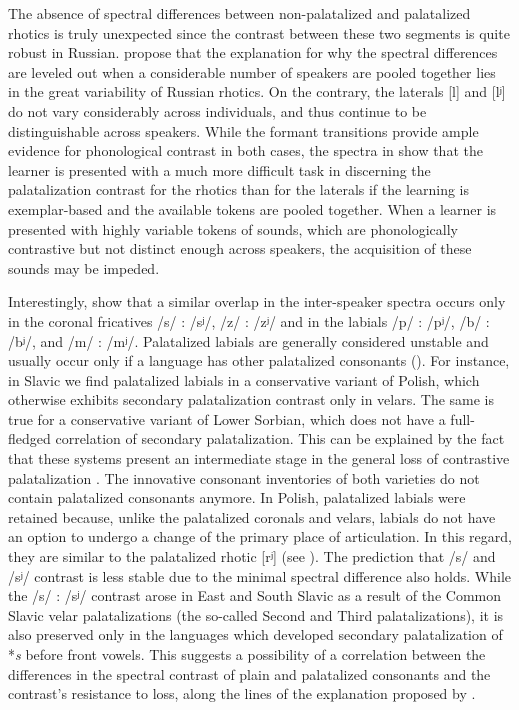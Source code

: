 \documentclass[output=paper]{langscibook}
\begin{document}
The absence of spectral differences between non-palatalized and palatalized rhotics is truly unexpected since the contrast between these two segments is quite robust in Russian. \citet{IskarousKavitskaya2018} propose that the explanation for why the spectral differences are leveled out when a considerable number of speakers are pooled together lies in the great variability of Russian rhotics. On the contrary, the laterals [l] and [lʲ] do not vary considerably across individuals, and thus continue to be distinguishable across speakers. While the formant transitions provide ample evidence for phonological contrast in both cases, the spectra in  show that the learner is presented with a much more difficult task in discerning the palatalization contrast for the rhotics than for the laterals if the learning is exemplar-based and the available tokens are pooled together. When a learner is presented with highly variable tokens of sounds, which are phonologically contrastive but not distinct enough across speakers, the acquisition of these sounds may be impeded.

Interestingly, \citet{IskarousKavitskaya2018} show that a similar overlap in the inter-speaker spectra occurs only in the coronal fricatives /s/ : /sʲ/, /z/ : /zʲ/ and in the labials /p/ : /pʲ/, /b/ : /bʲ/, and /m/ : /mʲ/. Palatalized labials are generally considered unstable and usually occur only if a language has other palatalized consonants (\citealt{Hock2006,Bateman2011}). For instance, in Slavic we find palatalized labials in a conservative variant of Polish, which otherwise exhibits secondary palatalization contrast only in velars. The same is true for a conservative variant of Lower Sorbian, which does not have a full-fledged correlation of secondary palatalization. This can be explained by the fact that these systems present an intermediate stage in the general loss of contrastive palatalization \citep[33 ff.]{Stadnik2002}. The innovative consonant inventories of both varieties do not contain palatalized consonants anymore. In Polish, palatalized labials were retained because, unlike the palatalized coronals and velars, labials do not have an option to undergo a change of the primary place of articulation. In this regard, they are similar to the palatalized rhotic [rʲ] (see \citealt{WandlKavitskaya2023}). The prediction that /s/ and /sʲ/ contrast is less stable due to the minimal spectral difference also holds. While the /s/ : /sʲ/ contrast arose in East and South Slavic as a result of the Common Slavic velar palatalizations (the so-called Second and Third palatalizations), it is also preserved only in the languages which developed secondary palatalization of *\textit{s} before front vowels. This suggests a possibility of a correlation between the differences in the spectral contrast of plain and palatalized consonants and the contrast’s resistance to loss, along the lines of the explanation proposed by \citet{IskarousKavitskaya2018}.
\end{document}
